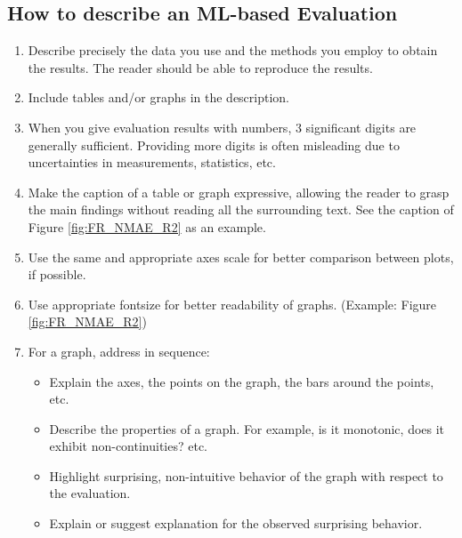 \documentclass[10pt]{article} %
\begin{document}
\subsection*{How to describe an ML-based Evaluation}

\begin{enumerate}[labelsep=0.7em, leftmargin=*]%
    \item Describe precisely the data you use and the methods you employ to obtain the results. The reader should be able to reproduce the results. 
    \item Include tables and/or graphs in the description. 
    \item When you give evaluation results with numbers, 3 significant digits are generally sufficient. Providing more digits is often misleading due to uncertainties in measurements, statistics, etc. 
    \item Make the caption of a table or graph expressive, allowing the reader to grasp the main findings without reading all the surrounding text. See the caption of Figure \ref{fig:FR_NMAE_R2} as an example.
    \item  Use the same and appropriate axes scale for better comparison between plots, if possible.
    \item Use appropriate fontsize for better readability of graphs. (Example: Figure \ref{fig:FR_NMAE_R2})
    \item For a graph, address in sequence: 
        \begin{itemize}
        \item 
        Explain the axes, the points on the graph, the bars around the points, etc.
        \item 
        Describe the properties of a graph. For example, is it monotonic, does it exhibit non-continuities? etc.
        \item 
        Highlight surprising, non-intuitive behavior of the graph with respect to the evaluation.
        \item 
        Explain or suggest explanation for the observed surprising behavior.
        \end{itemize} 
\end{enumerate}
\end{document}
